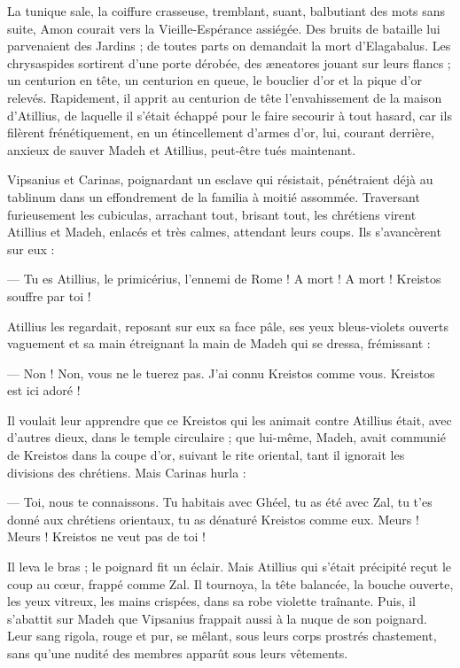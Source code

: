 \documentclass[a4paper, 11pt, oneside, polutonikogreek, french]{article}
\begin{document}
La tunique sale, la coiffure crasseuse, tremblant, suant, balbutiant des mots sans suite, Amon courait vers la Vieille-Espérance assiégée. Des bruits de bataille lui parvenaient des Jardins ; de toutes parts on demandait la mort d'Elagabalus. Les chrysaspides sortirent d'une porte dérobée, des æneatores jouant sur leurs flancs ; un centurion en tête, un centurion en queue, le bouclier d'or et la pique d'or relevés. Rapidement, il apprit au centurion de tête l'envahissement de la maison d'Atillius, de laquelle il s'était échappé pour le faire secourir à tout hasard, car ils filèrent frénétiquement, en un étincellement d'armes d'or, lui, courant derrière, anxieux de sauver Madeh et Atillius, peut-être tués maintenant.

Vipsanius et Carinas, poignardant un esclave qui résistait, pénétraient déjà au tablinum dans un effondrement de la familia à moitié assommée. Traversant furieusement les cubiculas, arrachant tout, brisant tout, les chrétiens virent Atillius et Madeh, enlacés et très calmes, attendant leurs coups. Ils s'avancèrent sur eux :

--- Tu es Atillius, le primicérius, l'ennemi de Rome ! A mort ! A mort ! Kreistos souffre par toi !

Atillius les regardait, reposant sur eux sa face pâle, ses yeux bleus-violets ouverts vaguement et sa main étreignant la main de Madeh qui se dressa, frémissant :

--- Non ! Non, vous ne le tuerez pas. J'ai connu Kreistos comme vous. Kreistos est ici adoré !

Il voulait leur apprendre que ce Kreistos qui les animait contre Atillius était, avec d'autres dieux, dans le temple circulaire ; que lui-même, Madeh, avait communié de Kreistos dans la coupe d'or, suivant le rite oriental, tant il ignorait les divisions des chrétiens. Mais Carinas hurla :

--- Toi, nous te connaissons. Tu habitais avec Ghéel, tu as été avec Zal, tu t'es donné aux chrétiens orientaux, tu as dénaturé Kreistos comme eux. Meurs ! Meurs ! Kreistos ne veut pas de toi !

Il leva le bras ; le poignard fit un éclair. Mais Atillius qui s'était précipité reçut le coup au cœur, frappé comme Zal. Il tournoya, la tête balancée, la bouche ouverte, les yeux vitreux, les mains crispées, dans sa robe violette traînante. Puis, il s'abattit sur Madeh que Vipsanius frappait aussi à la nuque de son poignard. Leur sang rigola, rouge et pur, se mêlant, sous leurs corps prostrés chastement, sans qu'une nudité des membres apparût sous leurs vêtements.
\end{document}
